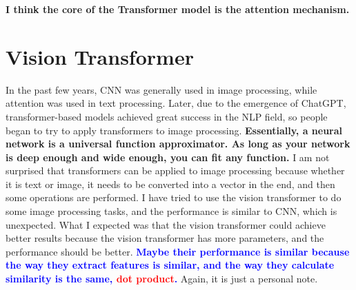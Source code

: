\documentclass[oneside]{book}
\begin{document}
\textbf{I think the core of the Transformer model is the attention mechanism.}
\section{Vision Transformer}
In the past few years, CNN was generally used in image processing, while attention was used in text processing.
Later, due to the emergence of ChatGPT, transformer-based models achieved great success in the NLP field, so people began to try to apply transformers to image processing.
\textbf{Essentially, a neural network is a universal function approximator. As long as your network is deep enough and wide enough, you can fit any function.}
I am not surprised that transformers can be applied to image processing because whether it is text or image, it needs to be converted into a vector in the end, and then some operations are performed.
I have tried to use the vision transformer to do some image processing tasks, and the performance is similar to CNN, which is unexpected. 
What I expected was that the vision transformer could achieve better results because the vision transformer has more parameters, and the performance should be better.
\textbf{\textcolor{blue}{Maybe their performance is similar because the way they extract features is similar, and the way they calculate similarity is the same, \textcolor{red}{dot product}.}}
Again, it is just a personal note. 
\end{document}
